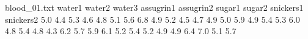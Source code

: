\begin{filecontents}{blood_01.txt}
water1 water2 water3 assugrin1 assugrin2 sugar1 sugar2 snickers1 snickers2
5.0 4.4 5.3 4.6 4.8 5.1 5.6 6.8 4.9
5.2 4.5 4.7 4.9 5.0 5.9 4.9 5.4 5.3
6.0 4.8 5.4 4.8 4.3 6.2 5.7 5.9 6.1
5.2 5.4 5.2 4.9 4.9 6.4 7.0 5.1 5.7
\end{filecontents}
